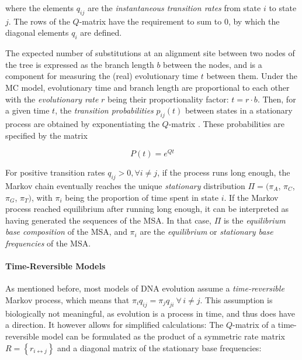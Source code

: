 where the elements $q_{ij}$ are the \emph{instantaneous transition rates} from state $i$ to state $j$.
The rows of the $Q$-matrix have the requirement to sum to $0$,
by which the diagonal elements $q_{i}$ are defined.

The expected number of substitutions at an alignment site between two nodes of the tree
is expressed as the branch length $b$ between the nodes,
and is a component for measuring the (real) evolutionary time $t$ between them.
Under the MC model, evolutionary time and branch length are proportional to each other
with the \emph{evolutionary rate} $r$ being their proportionality factor: $t = r \cdot b$.
Then, for a given time $t$, the \emph{transition probabilities} $p_{ij}(t)$ between states in a stationary process
are obtained by exponentiating the $Q$-matrix \cite{Yang2014}.
These probabilities are specified by the matrix

\begin{equation}
    \label{ch:Foundations:sec:MLTreeInference:eq:P_matrix}
    P(t) = e^{Qt}
\end{equation}

For positive transition rates $q_{ij} > 0, \forall i \neq j$, if the process runs long enough,
the Markov chain eventually reaches the unique \emph{stationary} distribution $\Pi = (\pi_A$, $\pi_C$, $\pi_G$, $\pi_T )$,
with $\pi_i$ being the proportion of time spent in state $i$.
If the Markov process reached equilibrium after running long enough,
it can be interpreted as having generated the sequences of the MSA.
In that case, $\Pi$ is the \emph{equilibrium base composition} of the MSA,
and $\pi_i$ are the \emph{equilibrium} or \emph{stationary base frequencies} of the MSA.

\paragraph{Time-Reversible Models}
\label{ch:Foundations:sec:MLTreeInference:sub:ModelsOfSeqEvol:par:TimeReversibleModels}

As mentioned before, most models of DNA evolution assume a \emph{time-reversible} Markov process,
which means that $\pi_{i} q_{ij} = \pi_{j} q_{ji} ~ \forall \, i \neq j$.
This assumption is biologically not meaningful, as evolution is a process in time, and thus does have a direction.
It however allows for simplified calculations:
The $Q$-matrix of a time-reversible model can be formulated as the product of
a symmetric rate matrix $R = \left\{ r_{i \leftrightarrow j} \right\}$ and
a diagonal matrix of the stationary base frequencies:

